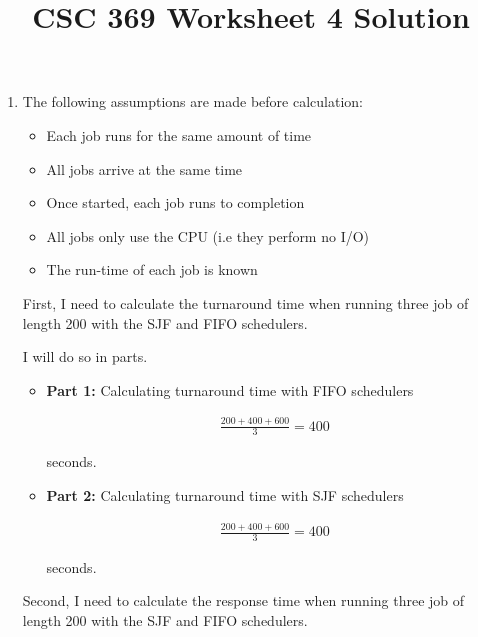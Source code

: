 \documentclass[12pt]{article}
\begin{document}
\title{CSC 369 Worksheet 4 Solution}
\maketitle

\bigskip

\begin{enumerate}[1.]
    \item

    The following assumptions are made before calculation:

    \begin{itemize}
        \item Each job runs for the same amount of time
        \item All jobs arrive at the same time
        \item Once started, each job runs to completion
        \item All jobs only use the CPU (i.e they perform no I/O)
        \item The run-time of each job is known
    \end{itemize}

    \bigskip

    First, I need to calculate the turnaround time when running three job of length 200
    with the SJF and FIFO schedulers.

    \bigskip

    I will do so in parts.

    \bigskip

    \begin{itemize}
        \item \textbf{Part 1:} Calculating turnaround time with FIFO schedulers

        \begin{align}
            \frac{200 + 400 + 600}{3} = 400
        \end{align}

        seconds.

        \item \textbf{Part 2:} Calculating turnaround time with SJF schedulers

        \begin{align}
            \frac{200 + 400 + 600}{3} = 400
        \end{align}

        seconds.
    \end{itemize}

    Second, I need to calculate the response time when running three job of length 200
    with the SJF and FIFO schedulers.


\end{enumerate}
\end{document}
